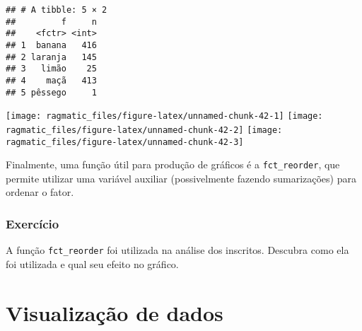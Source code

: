 \documentclass[]{book}
\newenvironment{Shaded}{\begin{snugshade}}{\end{snugshade}}
\newcommand{\KeywordTok}[1]{\textcolor[rgb]{0.13,0.29,0.53}{\textbf{{#1}}}}
\newcommand{\DataTypeTok}[1]{\textcolor[rgb]{0.13,0.29,0.53}{{#1}}}
\newcommand{\DecValTok}[1]{\textcolor[rgb]{0.00,0.00,0.81}{{#1}}}
\newcommand{\StringTok}[1]{\textcolor[rgb]{0.31,0.60,0.02}{{#1}}}
\newcommand{\CommentTok}[1]{\textcolor[rgb]{0.56,0.35,0.01}{\textit{{#1}}}}
\newcommand{\NormalTok}[1]{{#1}}
\begin{document}
\begin{verbatim}
## # A tibble: 5 × 2
##         f     n
##    <fctr> <int>
## 1  banana   416
## 2 laranja   145
## 3   limão    25
## 4    maçã   413
## 5 pêssego     1
\end{verbatim}

\begin{Shaded}
\end{Shaded}

\texttt{[image: ragmatic\_files/figure-latex/unnamed-chunk-42-1]}
\texttt{[image: ragmatic\_files/figure-latex/unnamed-chunk-42-2]}
\texttt{[image: ragmatic\_files/figure-latex/unnamed-chunk-42-3]}

Finalmente, uma função útil para produção de gráficos é a
\texttt{fct\_reorder}, que permite utilizar uma variável auxiliar
(possivelmente fazendo sumarizações) para ordenar o fator.

\subsection{Exercício}\label{exercicio-1}

A função \texttt{fct\_reorder} foi utilizada na análise dos inscritos.
Descubra como ela foi utilizada e qual seu efeito no gráfico.

\chapter{Visualização de dados}\label{visualizacao-de-dados}
\end{document}
